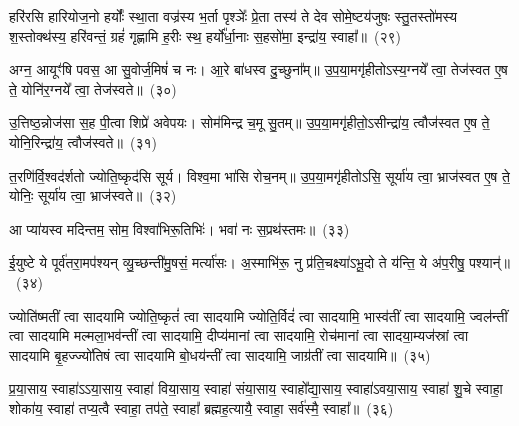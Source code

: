 {\anuvakamend[{बृह॒स्पति॑सुतस्य॒ पञ्च॑दश}]}%

हरि॑रसि हारियोज॒नो हर्योः᳚ स्था॒ता वज्र॑स्य भ॒र्ता पृश्ञेः᳚ प्रे॒ता तस्य॑ ते देव सोमे॒ष्टय॑जुषः स्तु॒तस्तो॑मस्य श॒स्तोक्थ॑स्य॒ हरि॑वन्तं॒ ग्रहं॑ गृह्णामि ह॒रीः स्थ॒ हर्यो᳚र्धा॒नाः स॒हसो॑मा॒ इन्द्रा॑य॒ स्वाहा᳚॥~(२९)

{\anuvakamend[{हरिः॒ षड्विꣳ॑शतिः}]}%

अग्न॒ आयूꣳ॑षि पवस॒ आ सु॒वोर्ज॒मिषं॑ च नः। आ॒रे बा॑धस्व दु॒च्छुना᳚म्॥ उ॒प॒या॒मगृ॑हीतो\-ऽस्य॒ग्नये᳚ त्वा॒ तेज॑स्वत ए॒ष ते॒ योनि॑र॒ग्नये᳚ त्वा॒ तेज॑स्वते॥~(३०)

{\anuvakamend[{अग्न॒ आयूꣳ॑षि॒ त्रयो॑वि ꣳशतिः}]}%

उ॒त्तिष्ठ॒न्नोज॑सा स॒ह पी॒त्वा शिप्रे॑ अवेपयः। सोम॑मिन्द्र च॒मू सु॒तम्॥ उ॒प॒या॒मगृ॑हीतो॒\-ऽसीन्द्रा॑य॒ त्वौज॑स्वत ए॒ष ते॒ योनि॒रिन्द्रा॑य॒ त्वौज॑स्वते॥~(३१)

{\anuvakamend[{उ॒त्तिष्ठ॒न्नेक॑विꣳशतिः}]}%

त॒रणि॑र्वि॒श्वद॑र्\mbox{}शतो ज्योति॒ष्कृद॑सि सूर्य। विश्व॒मा भा॑सि रोच॒नम्॥ उ॒प॒या॒मगृ॑हीतो\-ऽसि॒ सूर्या॑य त्वा॒ भ्राज॑स्वत ए॒ष ते॒ योनिः॒ सूर्या॑य त्वा॒ भ्राज॑स्वते॥~(३२)

{\anuvakamend[{त॒रणि॑र्विꣳश॒तिः}]}%

आ प्या॑यस्व मदिन्तम॒ सोम॒ विश्वा॑भिरू॒तिभिः॑। भवा॑ नः स॒प्रथ॑स्तमः॥~(३३)

{\anuvakamend[{आ प्या॑यस्व॒ नव॑}]}%

ई॒युष्टे ये पूर्व॑तरा॒मप॑श्यन् व्यु॒च्छन्ती॑मु॒षसं॒ मर्त्या॑सः। अ॒स्माभि॑रू॒ नु प्र॑ति॒चक्ष्या॑\-ऽभू॒दो ते य॑न्ति॒ ये अ॑प॒रीषु॒ पश्यान्॑॥~(३४)

{\anuvakamend[{ई॒युरेका॒न्नविꣳ॑शतिः}]}%

ज्योति॑ष्मतीं त्वा सादयामि ज्योति॒ष्कृतं॑ त्वा सादयामि ज्योति॒र्विदं॑ त्वा सादयामि॒ भास्व॑तीं त्वा सादयामि॒ ज्वल॑न्तीं त्वा सादयामि मल्मला॒भव॑न्तीं त्वा सादयामि॒ दीप्य॑मानां त्वा सादयामि॒ रोच॑मानां त्वा सादया॒म्यज॑स्रां त्वा सादयामि बृ॒हज्ज्यो॑तिषं त्वा सादयामि बो॒धय॑न्तीं त्वा सादयामि॒ जाग्र॑तीं त्वा सादयामि॥~(३५)

{\anuvakamend[{ज्योति॑ष्मती॒ꣳ॒ षट्त्रिꣳ॑शत्}]}%

प्र॒या॒साय॒ स्वाहा॑\-ऽ\-ऽया॒साय॒ स्वाहा॑ विया॒साय॒ स्वाहा॑ संया॒साय॒ स्वाहो᳚द्या॒साय॒ स्वाहा॑\-ऽवया॒साय॒ स्वाहा॑ शु॒चे स्वाहा॒ शोका॑य॒ स्वाहा॑ तप्य॒त्वै स्वाहा॒ तप॑ते॒ स्वाहा᳚ ब्रह्मह॒त्यायै॒ स्वाहा॒ सर्व॑स्मै॒ स्वाहा᳚॥~(३६)

